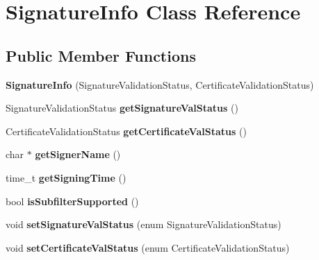 \hypertarget{class_signature_info}{}\section{Signature\+Info Class Reference}
\label{class_signature_info}
\subsection*{Public Member Functions}
\begin{DoxyCompactItemize}
\item 
\mbox{\label{class_signature_info_a49f7cdde37051990ee3cd6c025325505}} 
{\bfseries Signature\+Info} (Signature\+Validation\+Status, Certificate\+Validation\+Status)
\item 
\mbox{\label{class_signature_info_a3c6e5781ef5441ede6ba0ca8d9374988}} 
Signature\+Validation\+Status {\bfseries get\+Signature\+Val\+Status} ()
\item 
\mbox{\label{class_signature_info_a0d51b05fb91dda420828fd6a0caf96be}} 
Certificate\+Validation\+Status {\bfseries get\+Certificate\+Val\+Status} ()
\item 
\mbox{\label{class_signature_info_a20b357cad2d4e5bb8775c0439f345174}} 
char $\ast$ {\bfseries get\+Signer\+Name} ()
\item 
\mbox{\label{class_signature_info_ab74b8a859e72c9a4476b048d4e1f0043}} 
time\+\_\+t {\bfseries get\+Signing\+Time} ()
\item 
\mbox{\label{class_signature_info_a2e582671418fffa941becab918011f0b}} 
bool {\bfseries is\+Subfilter\+Supported} ()
\item 
\mbox{\label{class_signature_info_a47a493ae6ba2555b42fe2e5a0a80df87}} 
void {\bfseries set\+Signature\+Val\+Status} (enum Signature\+Validation\+Status)
\item 
\mbox{\label{class_signature_info_ac2ae40bbcdedcb623797c286e4cd5d8f}} 
void {\bfseries set\+Certificate\+Val\+Status} (enum Certificate\+Validation\+Status)

\end{DoxyCompactItemize}
